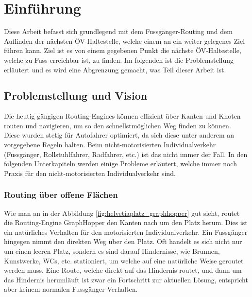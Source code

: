 \section{Einführung}
\label{sec:Einführung}
Diese Arbeit befasst sich grundlegend mit dem Fussgänger-Routing und dem Auffinden der nächsten ÖV-Haltestelle, welche einem an ein weiter gelegenes Ziel führen kann. Ziel ist es von einem gegebenen Punkt die nächste ÖV-Haltestelle, welche zu Fuss erreichbar ist, zu finden. Im folgenden ist die Problemstellung erläutert und es wird eine Abgrenzung gemacht, was Teil dieser Arbeit ist.

\subsection{Problemstellung und Vision}
\label{sub:Problemstellung und Vision}
Die heutig gängigen Routing-Engines können effizient über Kanten und Knoten routen und navigieren, um so den schnellstmöglichen Weg finden zu können. Diese wurden stetig für Autofahrer optimiert, da sich diese unter anderem an vorgegebene Regeln halten. Beim nicht-motorisierten Individualverkehr (Fussgänger, Rollstuhlfahrer, Radfahrer, etc.)  ist das nicht immer der Fall. In den folgenden Unterkapiteln werden einige Probleme erläutert, welche immer noch Praxis für den nicht-motorisierten Individualverkehr sind.

\subsubsection{Routing über offene Flächen}
\label{subsub:Routing über offene Flächen}

Wie man an in der Abbildung \ref{fig:helvetiaplatz_graphhopper} gut sieht, routet die Routing-Engine GraphHopper den Kanten nach um den Platz herum. Dies ist ein natürliches Verhalten für den motorisierten Individualverkehr. Ein Fussgänger hingegen nimmt den direkten Weg über den Platz. Oft handelt es sich nicht nur um einen leeren Platz, sondern es sind darauf Hindernisse, wie Brunnen, Kunstwerke, WCs, etc. stationiert, um welche auf eine natürliche Weise geroutet werden muss. Eine Route, welche direkt auf das Hindernis routet, und dann um das Hindernis herumläuft ist zwar ein Fortschritt zur aktuellen Lösung, entspricht aber keinem normalen Fussgänger-Verhalten. 

